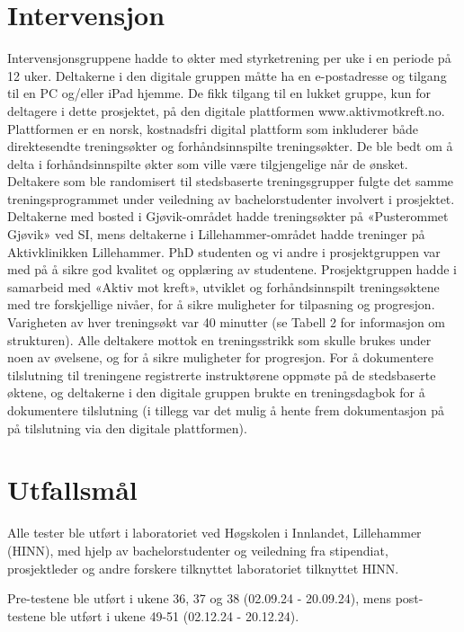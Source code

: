 \documentclass[
  letterpaper,
  DIV=11,
  numbers=noendperiod]{scrreprt}
\begin{document}
\hypertarget{intervensjon}{%
\section{Intervensjon}\label{intervensjon}}

Intervensjonsgruppene hadde to økter med styrketrening per uke i en
periode på 12 uker. Deltakerne i den digitale gruppen måtte ha en
e-postadresse og tilgang til en PC og/eller iPad hjemme. De fikk tilgang
til en lukket gruppe, kun for deltagere i dette prosjektet, på den
digitale plattformen www.aktivmotkreft.no. Plattformen er en norsk,
kostnadsfri digital plattform som inkluderer både direktesendte
treningsøkter og forhåndsinnspilte treningsøkter. De ble bedt om å delta
i forhåndsinnspilte økter som ville være tilgjengelige når de ønsket.
Deltakere som ble randomisert til stedsbaserte treningsgrupper fulgte
det samme treningsprogrammet under veiledning av bachelorstudenter
involvert i prosjektet. Deltakerne med bosted i Gjøvik-området hadde
treningsøkter på «Pusterommet Gjøvik» ved SI, mens deltakerne i
Lillehammer-området hadde treninger på Aktivklinikken Lillehammer. PhD
studenten og vi andre i prosjektgruppen var med på å sikre god kvalitet
og opplæring av studentene. Prosjektgruppen hadde i samarbeid med «Aktiv
mot kreft», utviklet og forhåndsinnspilt treningsøktene med tre
forskjellige nivåer, for å sikre muligheter for tilpasning og
progresjon. Varigheten av hver treningsøkt var 40 minutter (se Tabell 2
for informasjon om strukturen). Alle deltakere mottok en treningsstrikk
som skulle brukes under noen av øvelsene, og for å sikre muligheter for
progresjon. For å dokumentere tilslutning til treningene registrerte
instruktørene oppmøte på de stedsbaserte øktene, og deltakerne i den
digitale gruppen brukte en treningsdagbok for å dokumentere tilslutning
(i tillegg var det mulig å hente frem dokumentasjon på på tilslutning
via den digitale plattformen).

\hypertarget{utfallsmuxe5l}{%
\section{Utfallsmål}\label{utfallsmuxe5l}}

Alle tester ble utført i laboratoriet ved Høgskolen i Innlandet,
Lillehammer (HINN), med hjelp av bachelorstudenter og veiledning fra
stipendiat, prosjektleder og andre forskere tilknyttet laboratoriet
tilknyttet HINN.

Pre-testene ble utført i ukene 36, 37 og 38 (02.09.24 - 20.09.24), mens
post-testene ble utført i ukene 49-51 (02.12.24 - 20.12.24).
\end{document}
